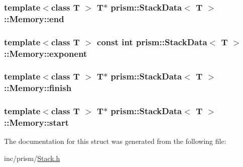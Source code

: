\subsubsection[{\texorpdfstring{end}{end}}]{\setlength{\rightskip}{0pt plus 5cm}template$<$class T $>$ T$\ast$ {\bf prism\+::\+Stack\+Data}$<$ T $>$\+::Memory\+::end}\hypertarget{structprism_1_1_stack_data_1_1_memory_a4c2fc53a644757cf033636c013265eeb}{}\label{structprism_1_1_stack_data_1_1_memory_a4c2fc53a644757cf033636c013265eeb}
\subsubsection[{\texorpdfstring{exponent}{exponent}}]{\setlength{\rightskip}{0pt plus 5cm}template$<$class T $>$ const int {\bf prism\+::\+Stack\+Data}$<$ T $>$\+::Memory\+::exponent}\hypertarget{structprism_1_1_stack_data_1_1_memory_a0a82a73b0dd4e34356f933b0ebcf4649}{}\label{structprism_1_1_stack_data_1_1_memory_a0a82a73b0dd4e34356f933b0ebcf4649}
\subsubsection[{\texorpdfstring{finish}{finish}}]{\setlength{\rightskip}{0pt plus 5cm}template$<$class T $>$ T$\ast$ {\bf prism\+::\+Stack\+Data}$<$ T $>$\+::Memory\+::finish}\hypertarget{structprism_1_1_stack_data_1_1_memory_a9078f4f85440e6c401abfb4888ff4c50}{}\label{structprism_1_1_stack_data_1_1_memory_a9078f4f85440e6c401abfb4888ff4c50}
\subsubsection[{\texorpdfstring{start}{start}}]{\setlength{\rightskip}{0pt plus 5cm}template$<$class T $>$ T$\ast$ {\bf prism\+::\+Stack\+Data}$<$ T $>$\+::Memory\+::start}\hypertarget{structprism_1_1_stack_data_1_1_memory_a5ca6f889c85fca00ab1bbf7f93d994cb}{}\label{structprism_1_1_stack_data_1_1_memory_a5ca6f889c85fca00ab1bbf7f93d994cb}


The documentation for this struct was generated from the following file\+:\begin{DoxyCompactItemize}
\item 
inc/prism/\hyperlink{_stack_8h}{Stack.\+h}\end{DoxyCompactItemize}
